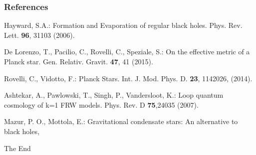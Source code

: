\documentclass{beamer}
\begin{document}
\begin{frame}
\frametitle{References}
\footnotesize{
\begin{thebibliography}{99} %

 Hayward, S.A.: Formation and Evaporation of regular black holes. Phys. Rev. Lett. \textbf{96}, 31103 (2006).

 De Lorenzo, T., Pacilio, C., Rovelli, C., Speziale, S.: On the effective metric of a Planck star. Gen. Relativ. Gravit. \textbf{47}, 41 (2015).

 Rovelli, C., Vidotto, F.: Planck Stars. Int. J. Mod. Phys. D. \textbf{23}, 1142026, (2014).

 Ashtekar, A., Pawlowski, T., Singh, P., Vandersloot, K.: Loop quantum cosmology of k=1 FRW models. Phys. Rev. D \textbf{75},24035 (2007).

 Mazur, P. O., Mottola, E.: Gravitational condensate stars: An alternative to black holes, 

\end{thebibliography}
}
\end{frame}


\begin{frame}
\Huge{\centerline{The End}}
\end{frame}

\end{document}

